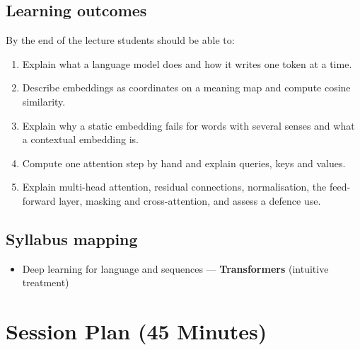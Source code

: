 \documentclass[11pt]{article}
\begin{document}
\subsection*{Learning outcomes}By the end of the lecture students should be able to:\begin{enumerate}\item Explain what a language model does and how it writes one token at a time.\item Describe embeddings as coordinates on a meaning map and compute cosine similarity.\item Explain why a static embedding fails for words with several senses and what a contextual embedding is.\item Compute one attention step by hand and explain queries, keys and values.\item Explain multi-head attention, residual connections, normalisation, the feed-forward layer, masking and cross-attention, and assess a defence use.\end{enumerate}

\subsection*{Syllabus mapping}\begin{itemize}\item Deep learning for language and sequences --- \textbf{Transformers} (intuitive treatment)\end{itemize}

\section{Session Plan (45 Minutes)}
\end{document}

